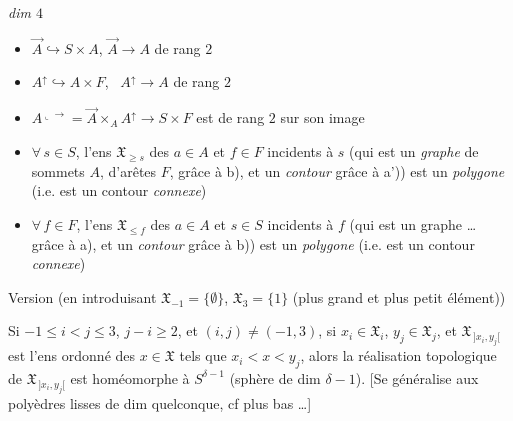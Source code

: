 \documentclass[11pt,a4paper]{article}
\begin{document}
\emph{dim $4$}




\begin{itemize}
  \item[a)] $\vec{A} \hookrightarrow S \times A$, \struck{$\forall$}
    $\vec{A} \to A$ de rang $2$
  \item[a')] $A^{\uparrow} \hookrightarrow A \times F$, \ $A^{\uparrow} \to A$
    de rang $2$
  \item[b)] $A^{\llcorner\!\to} = \vec{A} \times_A A^{\uparrow} \to S \times F$
    est de rang $2$ sur son image
  \item[c)] $\forall\, s \in S$, l'ens $\mathfrak{X}_{\geq s}$ des $a \in A$ et
    $f \in F$ incidents à $s$ (qui est un \emph{graphe} de sommets $A$,
    d'arêtes $F$, grâce à b), et un \emph{contour} grâce à a')) est un
    \emph{polygone} (i.e. est un contour \add{$\neq \emptyset$}
    \emph{connexe})
  \item[c')] $\forall\, f \in F$, l'ens $\mathfrak{X}_{\leq f}$ des $a \in A$
    et $s \in S$ incidents à $f$ (qui est un graphe … grâce à a), et un
    \emph{contour} grâce à b)) est un \emph{polygone} (i.e. est un contour
    \add{$\neq \emptyset$} \emph{connexe})
\end{itemize}

Version  (en introduisant $\mathfrak{X}_{-1} = \{\emptyset\}$,
$\mathfrak{X}_3 = \{1\}$ (plus grand et plus petit élément))

Si $-1 \leq i < j \leq 3$,  \uncertain{$\delta =$} $j - i \geq 2$,
et \struck{\ill{}} $(i,j) \neq (-1,3)$, si $x_i \in \mathfrak{X}_i$,
$y_j \in \mathfrak{X}_j$, et $\mathfrak{X}_{\,]x_i,y_j[}$ est l'ens ordonné
des $x \in \mathfrak{X}$ tels que $x_i < x < y_j$, alors la réalisation
topologique de $\mathfrak{X}_{\,]x_i,y_j[}$ est homéomorphe à
\struck{\ill{}} $S^{\delta-1}$ (sphère de dim $\delta - 1$). [Se généralise aux
polyèdres lisses de dim quelconque, cf plus bas …]
\end{document}
